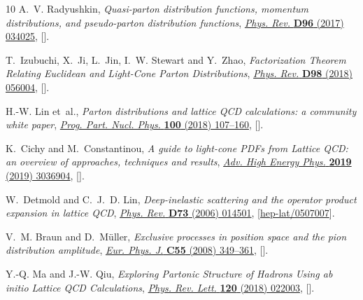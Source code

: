 \documentclass[12pt]{article}
\numberwithin{equation}{section}
\newcommand{\1}[1]{\mathbf{1}^{#1}}
\newcommand{\2}[1]{\mathbf{2}^{#1}}
\newcommand{\3}[1]{\mathbf{3}^{#1}}
\newcommand{\4}[1]{\mathbf{4}^{#1}}
\newcommand{\5}[1]{\mathbf{5}^{#1}}
\begin{document}
\begin{thebibliography}{10}
A.~V. Radyushkin, \emph{{Quasi-parton distribution functions, momentum
  distributions, and pseudo-parton distribution functions}},
  \href{http://dx.doi.org/10.1103/PhysRevD.96.034025}{\emph{Phys. Rev.}
  {\bfseries D96} (2017) 034025},
  [\href{https://arxiv.org/abs/1705.01488}{{}}].

T.~Izubuchi, X.~Ji, L.~Jin, I.~W. Stewart and Y.~Zhao, \emph{{Factorization
  Theorem Relating Euclidean and Light-Cone Parton Distributions}},
  \href{http://dx.doi.org/10.1103/PhysRevD.98.056004}{\emph{Phys. Rev.}
  {\bfseries D98} (2018) 056004},
  [\href{https://arxiv.org/abs/1801.03917}{{}}].

H.-W. Lin et~al., \emph{{Parton distributions and lattice QCD calculations: a
  community white paper}},
  \href{http://dx.doi.org/10.1016/j.ppnp.2018.01.007}{\emph{Prog. Part. Nucl.
  Phys.} {\bfseries 100} (2018) 107--160},
  [\href{https://arxiv.org/abs/1711.07916}{{}}].

K.~Cichy and M.~Constantinou, \emph{{A guide to light-cone PDFs from Lattice
  QCD: an overview of approaches, techniques and results}},
  \href{http://dx.doi.org/10.1155/2019/3036904}{\emph{Adv. High Energy Phys.}
  {\bfseries 2019} (2019) 3036904},
  [\href{https://arxiv.org/abs/1811.07248}{{}}].

W.~Detmold and C.~J.~D. Lin, \emph{{Deep-inelastic scattering and the operator
  product expansion in lattice QCD}},
  \href{http://dx.doi.org/10.1103/PhysRevD.73.014501}{\emph{Phys. Rev.}
  {\bfseries D73} (2006) 014501},
  [\href{https://arxiv.org/abs/hep-lat/0507007}{{\ttfamily hep-lat/0507007}}].

V.~M. Braun and D.~M{\"u}ller, \emph{{Exclusive processes in position space and
  the pion distribution amplitude}},
  \href{http://dx.doi.org/10.1140/epjc/s10052-008-0608-4}{\emph{Eur. Phys. J.}
  {\bfseries C55} (2008) 349--361},
  [\href{https://arxiv.org/abs/0709.1348}{{}}].

Y.-Q. Ma and J.-W. Qiu, \emph{{Exploring Partonic Structure of Hadrons Using ab
  initio Lattice QCD Calculations}},
  \href{http://dx.doi.org/10.1103/PhysRevLett.120.022003}{\emph{Phys. Rev.
  Lett.} {\bfseries 120} (2018) 022003},
  [\href{https://arxiv.org/abs/1709.03018}{{}}].


\end{thebibliography}
\end{document}

